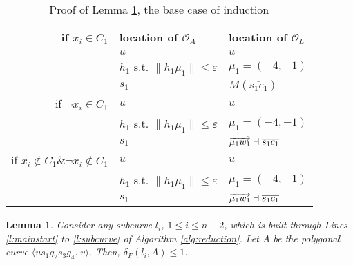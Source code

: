 \documentclass[12pt]{dalthesis}
\newtheorem{lemma}[theorem]{Lemma}
\newcommand{\eps}{\varepsilon}
\newcommand{\distF}{\delta_F}
\newcommand{\CO}{{\mathscr O}}
\newcommand{\gre}{{g}}
\newcommand{\sma}{{s}}
\newcommand{\Seg}[1]{{\overline{#1}}}
\newcommand{\cfev}{{l}}
\begin{document}
\begin{table}[h]
\centering
\begin{tabular}{ r | l | l  }
if $x_i \in C_1$   & location of $\CO_A$ & location of $\CO_L$  
 \\
\hline
    
&  $u$ & $u$  \\
&  				 $h_1$ s.t.  $\| h_1\mu_1 \| \le \eps$ & $\mu_1 = (-4,-1)$\\

& $s_1 $  & $M(\Seg{s_1c_1})$	      \\

\hline
if $\neg x_i \in C_1$ 
&  $u$ & $u$  \\
&  				 $h_1$ s.t.  $\| h_1\mu_1 \| \le \eps$ & $\mu_1 = (-4,-1)$\\

& $s_1$ &  $ \Dir{\mu_1w_1} \dashv	 \Seg{s_1c_1} $\\

\hline
if $x_i \notin C_{1} \& \neg x_i \notin C_{1}$ & $u$ & $u$  \\
&  				 $h_1$ s.t.  $\| h_1\mu_1 \| \le \eps$ & $\mu_1 = (-4,-1)$\\
& $s_1$ &  $ \Dir{\mu_1w_1} \dashv	 \Seg{s_1c_1} $\\

\end{tabular}
\vspace{0.2 in}
\caption{Proof of Lemma \ref{lemma:PathA}, the base case of induction}
\label{tab:BaseCasePathA}
\end{table}





\begin{lemma}\label{lemma:PathA}
Consider any subcurve $\cfev_i$, $1\le i \le n+2$,  
which is built through Lines \ref{l:mainstart} to \ref{l:subcurve} 
of Algorithm \ref{alg:reduction}. Let $A$ be the polygonal curve  $\langle u\sma_1\gre_2\sma_3\gre_4..v\rangle$. 
Then, $\distF(\cfev_i,A) \le 1$.
\end{lemma}
\end{document}
